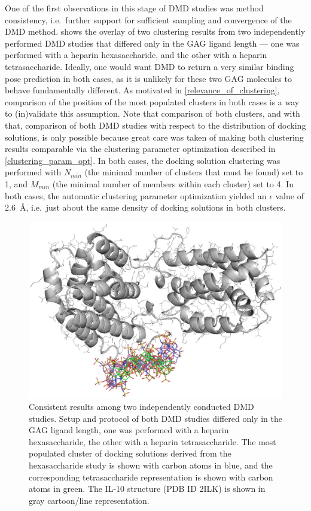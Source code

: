 One of the first observations in this stage of DMD studies was method
consistency, i.e.\ further support for sufficient sampling and convergence of
the DMD method. 
shows the overlay of two clustering results from two independently performed DMD
studies that differed only in the GAG ligand length --- one was performed with a
heparin hexasaccharide, and the other with a heparin tetrasaccharide. Ideally,
one would want DMD to return a very similar binding pose prediction in both
cases, as it is unlikely for these two GAG molecules to behave fundamentally
different. As motivated in \cref{relevance_of_clustering}, comparison of the
position of the most populated clusters in both cases is a way to (in)validate
this assumption. Note that comparison of both clusters, and with that,
comparison of both DMD studies with respect to the distribution of docking
solutions, is only possible because great care was taken of making both
clustering results comparable via the clustering parameter optimization
described in \cref{clustering_param_opt}. In both cases, the docking solution
clustering was performed with $N_{min}$ (the minimal number of clusters that
must be found) set to 1, and $M_{min}$ (the minimal number of members within
each cluster) set to 4. In both cases, the automatic clustering parameter
optimization yielded an $\epsilon$ value of \SI{2.6}{\angstrom}, i.e.\ just
about the same density of docking solutions in both clusters.

\begin{figure}
\centering
\includegraphics[width=1.0\textwidth]{gfx/dmdil10/hp_hexa_vs_tetra_clusters_position_match_cropped.jpg}
\caption[]{Consistent results among two independently conducted DMD studies.
Setup and protocol of both DMD studies differed only in the GAG ligand length,
one was performed with a heparin hexasaccharide, the other with a heparin
tetrasaccharide. The most populated cluster of docking solutions derived from
the hexasaccharide study is shown with carbon atoms in blue, and the
corresponding tetrasaccharide representation is shown with carbon atoms in
green. The IL-10 structure (PDB ID 2ILK) is shown in gray cartoon/line
representation.}
\label{fig:dmdil10:hp_hexa_vs_tetra_clusters_position_match}
\end{figure}

